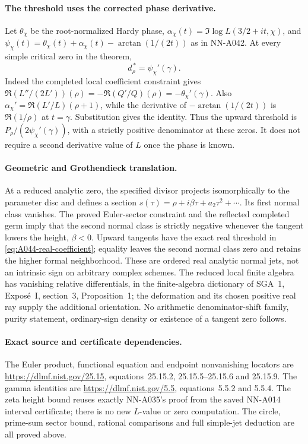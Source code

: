 \paragraph{The threshold uses the corrected phase derivative.}
Let $\theta_\chi$ be the root-normalized Hardy phase,
$\alpha_\chi(t)=\Im\log L(3/2+it,\chi)$, and
$\psi_\chi(t)=\theta_\chi(t)+\alpha_\chi(t)-\arctan(1/(2t))$
as in NN-A042. At every simple critical zero in the theorem,
\[
                         d_\rho^{\,*}=\psi_\chi'(\gamma).
\]
Indeed the completed local coefficient constraint gives
$\Re(L''/(2L'))(\rho)=-\Re(Q'/Q)(\rho)=-\theta_\chi'(\gamma)$.
Also $\alpha_\chi'=\Re(L'/L)(\rho+1)$, while
the derivative of $-\arctan(1/(2t))$ is
$\Re(1/\rho)$ at $t=\gamma$. Substitution gives the identity.
Thus the upward threshold is
$P_\rho/(2\psi_\chi'(\gamma))$, with a strictly positive
denominator at these zeros. It does not require a second
derivative value of $L$ once the phase is known.

\paragraph{Geometric and Grothendieck translation.}
At a reduced analytic zero, the specified divisor projects
isomorphically to the parameter disc and defines a section
$s(\tau)=\rho+i\beta\tau+a_2\tau^2+\cdots$. Its first
normal class vanishes. The proved Euler-sector constraint and
the reflected completed germ imply that the second normal
class is strictly negative whenever the tangent lowers the
height, $\beta<0$. Upward tangents have the exact real threshold
in \eqref{eq:A044-real-coefficient}; equality leaves the
second normal class zero and retains the higher formal
neighborhood. These are ordered real analytic normal jets,
not an intrinsic sign on arbitrary complex schemes.
The reduced local finite algebra has vanishing relative
differentials, in the finite-algebra dictionary of SGA~1,
Expos\'e~I, section~3, Proposition~1; the deformation and its
chosen positive real ray supply the additional orientation.
No arithmetic denominator-shift family, purity statement,
ordinary-sign density or existence of a tangent zero follows.

\paragraph{Exact source and certificate dependencies.}
The Euler product, functional equation and endpoint
nonvanishing locators are
\url{https://dlmf.nist.gov/25.15}, equations~25.15.2,
25.15.5--25.15.6 and 25.15.9.
The gamma identities are
\url{https://dlmf.nist.gov/5.5}, equations~5.5.2 and 5.5.4.
The zeta height bound reuses exactly NN-A035's proof from the
saved NN-A014 interval certificate; there is no new
$L$-value or zero computation. The circle, prime-sum sector
bound, rational comparisons and full simple-jet deduction
are all proved above.



